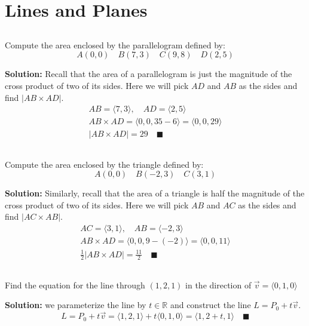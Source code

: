 \documentclass[letterpaper, 10pt]{article}
\begin{document}
\section{Lines and Planes}
\subsection{} Compute the area enclosed by the parallelogram defined by:
\[ A(0,0) \quad B(7,3) \quad C(9,8) \quad D(2,5) \]
\par \textbf{Solution:} Recall that the area of a parallelogram is just the magnitude of the cross product of two of its sides. Here we will pick $AD$ and $AB$ as the sides and find $|AB \times AD|$. 
\begin{gather*}
AB = \langle 7,3 \rangle, \quad AD = \langle 2,5 \rangle \\
AB \times AD = \langle 0, 0,  35 - 6\rangle = \langle 0, 0,  29\rangle \\
|AB \times AD| = 29 \quad\blacksquare
\end{gather*}

\subsection{} Compute the area enclosed by the triangle defined by:
\[ A(0, 0)\quad B(-2,3)\quad C(3, 1) \]
\par \textbf{Solution:} Similarly, recall that the area of a triangle is half the magnitude of the cross product of two of its sides. Here we will pick $AB$ and $AC$ as the sides and find $|AC \times AB|$. 
\begin{gather*}
AC = \langle 3,1 \rangle, \quad AB = \langle -2,3 \rangle \\
AB \times AD = \langle 0, 0,  9 - (-2)\rangle = \langle 0, 0,  11\rangle \\
\frac{1}{2} |AB \times AD| = \frac{11}{2} \quad\blacksquare
\end{gather*}

\subsection{} Find the equation for the line through $(1,2,1)$ in the direction of $\vec v = \langle 0, 1, 0 \rangle$
\par \textbf{Solution:} we parameterize the line by $ t \in \mathbb{R}$ and construct the line $L = P_0 + t \vec v$.
\[ L = P_0 + t \vec v = \langle 1,2,1 \rangle + t \langle 0,1,0 \rangle = \langle 1,2  + t,1 \rangle \quad\blacksquare \]
\end{document}
